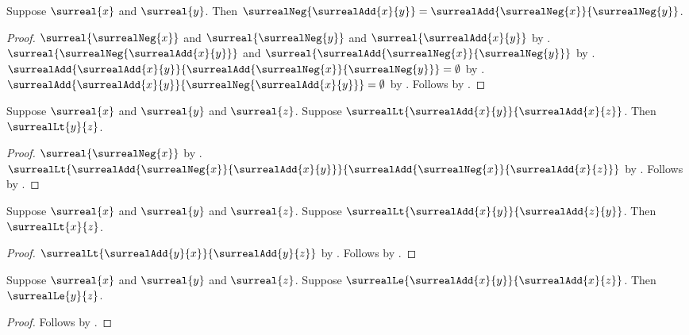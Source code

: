 \begin{theorem}\label{surreal_negation_additive}
    Suppose $\surreal{x}$ and $\surreal{y}$.
    Then $\surrealNeg{\surrealAdd{x}{y}}
        =\surrealAdd{\surrealNeg{x}}{\surrealNeg{y}}$.
\end{theorem}
\begin{proof}
    $\surreal{\surrealNeg{x}}$ and $\surreal{\surrealNeg{y}}$ and
        $\surreal{\surrealAdd{x}{y}}$
        by .
    $\surreal{\surrealNeg{\surrealAdd{x}{y}}}$ and
        $\surreal{\surrealAdd{\surrealNeg{x}}{\surrealNeg{y}}}$
        by .
    $\surrealAdd{\surrealAdd{x}{y}}
        {\surrealAdd{\surrealNeg{x}}{\surrealNeg{y}}}=\emptyset$
        by
        .
    $\surrealAdd{\surrealAdd{x}{y}}
        {\surrealNeg{\surrealAdd{x}{y}}}=\emptyset$
        by .
    Follows by .
\end{proof}

\begin{corollary}\label{surreal_add_lt_cancel_left}
    Suppose $\surreal{x}$ and $\surreal{y}$ and $\surreal{z}$.
    Suppose $\surrealLt{\surrealAdd{x}{y}}{\surrealAdd{x}{z}}$.
    Then $\surrealLt{y}{z}$.
\end{corollary}
\begin{proof}
    $\surreal{\surrealNeg{x}}$
        by .
    $\surrealLt
        {\surrealAdd{\surrealNeg{x}}{\surrealAdd{x}{y}}}
        {\surrealAdd{\surrealNeg{x}}{\surrealAdd{x}{z}}}$
        by .
    Follows by .
\end{proof}

\begin{corollary}\label{surreal_add_lt_cancel_right}
    Suppose $\surreal{x}$ and $\surreal{y}$ and $\surreal{z}$.
    Suppose $\surrealLt{\surrealAdd{x}{y}}{\surrealAdd{z}{y}}$.
    Then $\surrealLt{x}{z}$.
\end{corollary}
\begin{proof}
    $\surrealLt{\surrealAdd{y}{x}}{\surrealAdd{y}{z}}$
        by .
    Follows by .
\end{proof}

\begin{corollary}\label{surreal_add_le_cancel_left}
    Suppose $\surreal{x}$ and $\surreal{y}$ and $\surreal{z}$.
    Suppose $\surrealLe{\surrealAdd{x}{y}}{\surrealAdd{x}{z}}$.
    Then $\surrealLe{y}{z}$.
\end{corollary}
\begin{proof}
    Follows by .
\end{proof}

